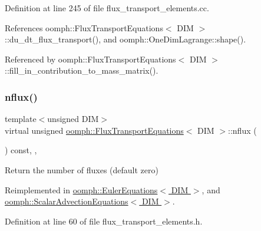 Definition at line 245 of file flux\+\_\+transport\+\_\+elements.\+cc.



References oomph\+::\+Flux\+Transport\+Equations$<$ D\+I\+M $>$\+::du\+\_\+dt\+\_\+flux\+\_\+transport(), and oomph\+::\+One\+Dim\+Lagrange\+::shape().



Referenced by oomph\+::\+Flux\+Transport\+Equations$<$ D\+I\+M $>$\+::fill\+\_\+in\+\_\+contribution\+\_\+to\+\_\+mass\+\_\+matrix().

\mbox{\label{classoomph_1_1FluxTransportEquations_ae77531d3bdd9241f450fdb360e7a5cc9}} 
\subsubsection{\texorpdfstring{nflux()}{nflux()}}
{\footnotesize\ttfamily template$<$unsigned D\+IM$>$ \\
virtual unsigned \hyperlink{classoomph_1_1FluxTransportEquations}{oomph\+::\+Flux\+Transport\+Equations}$<$ D\+IM $>$\+::nflux (\begin{DoxyParamCaption}{ }\end{DoxyParamCaption}) const\hspace{0.3cm}{\ttfamily [inline]}, {\ttfamily [protected]}, {\ttfamily [virtual]}}



Return the number of fluxes (default zero) 



Reimplemented in \hyperlink{classoomph_1_1EulerEquations_a6bf35d53c8c306df8865192ef85cc08f}{oomph\+::\+Euler\+Equations$<$ D\+I\+M $>$}, and \hyperlink{classoomph_1_1ScalarAdvectionEquations_adb45110daf7b47f7a2091448765b6f06}{oomph\+::\+Scalar\+Advection\+Equations$<$ D\+I\+M $>$}.



Definition at line 60 of file flux\+\_\+transport\+\_\+elements.\+h.

\mbox{\label{classoomph_1_1FluxTransportEquations_afd690f82a24bc20b686fc7d25a59f775}} 
